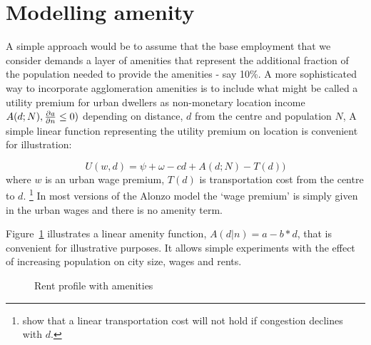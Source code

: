 \section{Modelling amenity}

A simple approach would be to assume that the base employment that we consider demands a layer of amenities that represent the additional fraction of  the population needed to provide the amenities - say 10\%. A more sophisticated  way to incorporate agglomeration amenities is to include what might be called a \gls{utility premium} for urban dwellers  as non-monetary location income $A(d; N), \frac{\partial a}{\partial n}\leq 0)$ depending on distance, $d$ from the centre and population $N$, A simple linear  function representing the utility premium on location is convenient for illustration:

\begin{equation}
U(w,d)= \psi+ \omega-cd + A(d; N) - T(d))
\label{eqn-u}
\end{equation}
where $w$  is an urban wage premium, $T(d)$ is transportation cost from the centre to $d$.
\footnote{\cite{anasUrbanSpatialStructure1998} show that a linear transportation cost will not  hold if congestion declines  with $d$.} 
 In most  versions of the Alonzo model the `wage premium' is simply given in the urban wages and  there is no amenity term. 


 
Figure~\ref{fig-amenity} illustrates a linear amenity function, $A(d|n)= a-b*d$, that is convenient for illustrative purposes.  It allows simple experiments with the effect of  increasing population on city size, wages and rents.

\begin{figure}[htbp]
\begin{center}

\end{center}
\caption{Rent profile with amenities}
\label{fig-amenity}
\end{figure}

